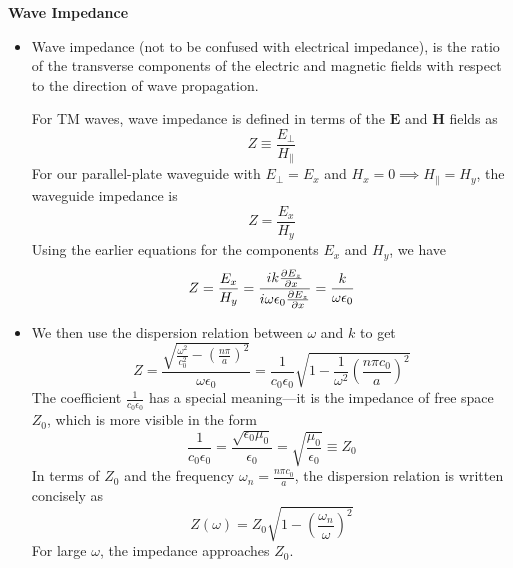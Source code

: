 \documentclass[11pt, a4paper]{article}
\renewcommand{\vec}[1]{\bm{#1}} %
\newcommand{\E}{\vec{E}}  %
\renewcommand{\H}{\vec{H}}  %
\newcommand{\ee}{\epsilon_{0}}  %
\newcommand{\mm}{\mu_{0}}  %
\newcommand{\m}{\vec{m}}  %
\begin{document}
\textbf{Wave Impedance}
\begin{itemize}
	\item Wave impedance (not to be confused with electrical impedance), is the ratio of the transverse components of the electric and magnetic fields with respect to the direction of wave propagation. 
	
	
	For TM waves, wave impedance is defined in terms of the $ \E $ and $ \H $ fields as
	\begin{equation*}
		Z \equiv \frac{E_{\perp}}{H_{\parallel}}
	\end{equation*}
	For our parallel-plate waveguide with $ E_{\perp} = E_{x} $ and $ H_{x} = 0 \implies H_{\parallel} = H_{y} $, the waveguide impedance is
	\begin{equation*}
		Z = \frac{E_{x}}{H_{y}}
	\end{equation*}
	Using the earlier equations for the components $ E_{x} $ and $ H_{y} $, we have
	\begin{equation*}
		Z = \frac{E_{x}}{H_{y}} = \frac{ik \pdv{E_{z}}{x}}{i \omega \ee \pdv{E_{z}}{x}} = \frac{k}{\omega \ee}
	\end{equation*}
	
	\item We then use the dispersion relation between $ \omega $ and $ k $ to get
	\begin{equation*}
		Z = \frac{\sqrt{\frac{\omega^{2}}{c_{0}^{2}} - \left(\frac{n\pi}{a}\right)^{2}}}{\omega \ee} = \frac{1}{c_{0}\ee}\sqrt{1 - \frac{1}{\omega^{2}}\left(\frac{n\pi c_{0}}{a}\right)^{2}}
	\end{equation*}
	The coefficient $ \frac{1}{c_{0}\ee} $ has a special meaning---it is the impedance of free space $ Z_{0} $, which is more visible in the form
	\begin{equation*}
		\frac{1}{c_{0}\ee} = \frac{\sqrt{\ee \mm}}{\ee} = \sqrt{\frac{\mm}{\ee}} \equiv Z_{0}
	\end{equation*}
	In terms of $ Z_{0} $ and the frequency $ \omega_{n} = \frac{n\pi c_{0}}{a}  $, the dispersion relation is written concisely as
	\begin{equation*}
		Z(\omega) = Z_{0}\sqrt{1 - \left(\frac{\omega_{n}}{\omega}\right)^{2}}
	\end{equation*}
	For large $ \omega $, the impedance approaches $ Z_{0} $. 
\end{itemize}
\end{document}
